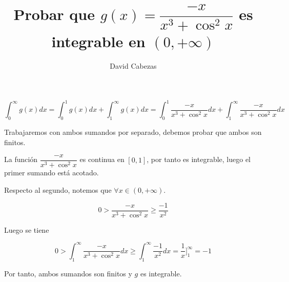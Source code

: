 \documentclass{article}
\begin{document}
\title{\Large Probar que $g(x)=\dfrac{-x}{x^3+\cos^2x}$ es integrable en $(0,+\infty)$}

\author{David Cabezas}
\date{}
\maketitle

\begin{displaymath}
  \int_0^\infty g(x)dx = \int_0^1 g(x)dx + \int_1^\infty g(x)dx = \int_0^1 \frac{-x}{x^3+\cos^2x}dx + \int_1^\infty \frac{-x}{x^3+\cos^2x}dx
\end{displaymath}

Trabajaremos con ambos sumandos por separado, debemos probar que ambos
son finitos.

La función $\dfrac{-x}{x^3+\cos^2x}$ es continua en $[0,1]$, por tanto
es integrable, luego el primer sumando está acotado.

Respecto al segundo, notemos que $\forall x \in (0,+\infty)$.

\begin{displaymath}
  0 > \frac{-x}{x^3+\cos^2x} \geq \frac{-1}{x^2}
\end{displaymath}

Luego se tiene

\begin{displaymath}
  0 > \int_1^\infty \frac{-x}{x^3+\cos^2x}dx \geq \int_1^\infty \frac{-1}{x^2}dx = \frac{1}{x}\bigg]_1^\infty = -1
\end{displaymath}

Por tanto, ambos sumandos son finitos y $g$ es integrable.
\end{document}

